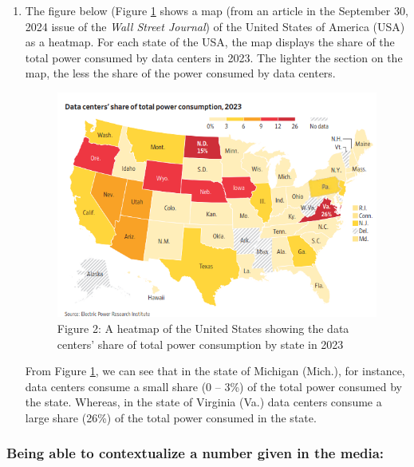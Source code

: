 \documentclass[
]{book}
\begin{document}
\begin{enumerate}
\def\labelenumi{\arabic{enumi}.}
\setcounter{enumi}{1}
\item
  The figure below (Figure \ref{fig2} shows a map (from an article in the September 30, 2024 issue of the \emph{Wall Street Journal}) of the United States of America (USA) as a heatmap. For each state of the USA, the map displays the share of the total power consumed by data centers in 2023. The lighter the section on the map, the less the share of the power consumed by data centers.

  \begin{figure}
  \centering
  \includegraphics[width=5.20833in,height=\textheight]{images/Data_Centers.png}
  \caption{Figure 2: A heatmap of the United States showing the data centers' share of total power consumption by state in 2023}\label{fig2}
  \end{figure}

  From Figure \ref{fig2}, we can see that in the state of Michigan (Mich.), for instance, data centers consume a small share (0 -- 3\%) of the total power consumed by the state. Whereas, in the state of Virginia (Va.) data centers consume a large share (26\%) of the total power consumed in the state.
\end{enumerate}

\subsubsection{Being able to contextualize a number given in the media:}\label{being-able-to-contextualize-a-number-given-in-the-media}
\end{document}
